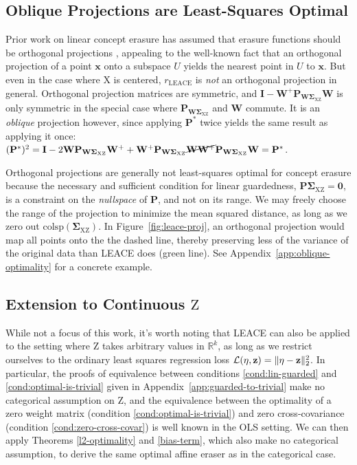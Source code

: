 \documentclass{article}
\theoremstyle{plain}
\theoremstyle{remark}
\newcommand{\sxz}{\mathbf \Sigma_{\rv X \rv Z}}
\newcommand{\pwxz}{\mathbf P_{\mathbf{W}\sxz}}
\newcommand{\xx}{\boldsymbol{x}}
\theoremstyle{plain}
\theoremstyle{TheoremNum}
\newcommand{\rv}[1]{{\mathrm{#1}}}
\newcommand{\loss}{\color{black} \mathcal{L}}
\begin{document}
\subsection{Oblique Projections are Least-Squares Optimal}
\label{sec:oblique}
Prior work on linear concept erasure has assumed that erasure functions should be orthogonal projections \cite{ravfogel-etal-2020-null, ravfogel2022adversarial, shao-etal-2023-gold}, appealing to the well-known fact that an orthogonal projection of a point $\xx$ onto a subspace $U$ yields the nearest point in $U$ to $\xx$. But even in the case where $\rv X$ is centered, $r_{\mathrm{LEACE}}$ is \emph{not} an orthogonal projection in general. Orthogonal projection matrices are symmetric, and $\mathbf I - \mathbf{W}^+ \pwxz\mathbf{W}$ is only symmetric in the special case where $\pwxz$ and $\mathbf{W}$ commute. It is an \emph{oblique} projection however, since applying $\mathbf P^*$ twice yields the same result as applying it once: $(\mathbf P^*)^2 = \mathbf I - 2\mathbf W \pwxz \mathbf W^+ + \mathbf{W}^+ \pwxz\cancel{\mathbf{W}\mathbf{W}^+} \pwxz\mathbf{W} = \mathbf P^*$.

Orthogonal projections are generally not least-squares optimal for concept erasure because the necessary and sufficient condition for linear guardedness, $\mathbf P \sxz = \mathbf{0}$, is a constraint on the \emph{nullspace} of $\mathbf{P}$, and not on its range. We may freely choose the range of the projection to minimize the mean squared distance, as long as we zero out $\mathrm{colsp}(\sxz)$. In Figure~\ref{fig:leace-proj}, an orthogonal projection would map all points onto the the dashed line, thereby preserving less of the variance of the original data than LEACE does (green line). See Appendix~\ref{app:oblique-optimality} for a concrete example.%

\subsection{Extension to Continuous $\rv Z$}

While not a focus of this work, it's worth noting that LEACE can also be applied to the setting where $\rv Z$ takes arbitrary values in $\mathbb R^k$, as long as we restrict ourselves to the ordinary least squares regression loss $\loss(\eta, \mathbf{z}) = \|\eta - \mathbf{z}\|^2_2$. In particular, the proofs of equivalence between conditions \ref{cond:lin-guarded} and \ref{cond:optimal-is-trivial} given in Appendix~\ref{app:guarded-to-trivial} make no categorical assumption on $\rv Z$, and the equivalence between the optimality of a zero weight matrix (condition \ref{cond:optimal-is-trivial}) and zero cross-covariance (condition \ref{cond:zero-cross-covar}) is well known in the OLS setting. We can then apply Theorems \ref{l2-optimality} and \ref{bias-term}, which also make no categorical assumption, to derive the same optimal affine eraser as in the categorical case.
\end{document}

